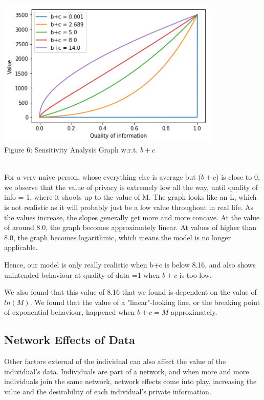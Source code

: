 \documentclass{icmmcm}
\begin{document}
\includegraphics[width=0.8\textwidth]{bplusc.png} 
\\ \caption{Figure 6: Sensitivity Analysis Graph w.r.t. $b+c$} \\

For a very naive person, whose everything else is average but ($b+c$) is close to 0, we observe that the value of privacy is extremely low all the way, until quality of info = 1, where it shoots up to the value of M. The graph looks like an L, which is not realistic as it will probably just be a low value throughout in real life.
As the values increase, the slopes generally get more and more concave.
At the value of around 8.0, the graph becomes approximately linear.
At values of higher than 8.0, the graph becomes logarithmic, which means the model is no longer applicable. 

Hence, our model is only really realistic when b+c is below 8.16, and also shows unintended behaviour at quality of data =1 when $b+c$ is too low.

We also found that this value of 8.16 that we found is dependent on the value of $ln(M)$. We found that the value of a "linear"-looking line, or the breaking point of exponential behaviour, happened when $b+c=M$ approximately.

\subsection{Network Effects of Data}
Other factors external of the individual can also affect the value of the individual’s data. Individuals are part of a network, and when more and more individuals join the same network, network effects come into play, increasing the value and the desirability of each individual’s private information.
\end{document}
